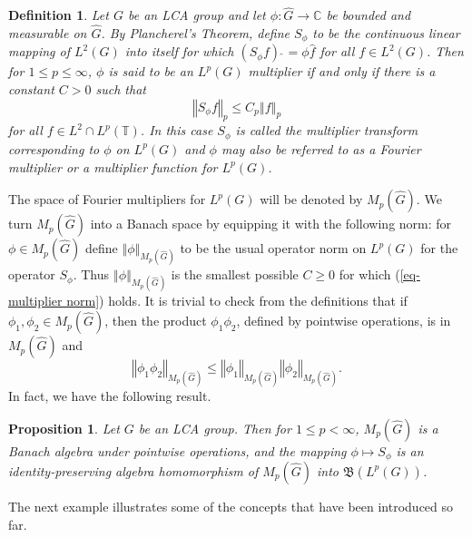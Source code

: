 \documentclass[mstat,12pt]{unswthesis}  %
\newcommand{\C}{\mathbb{C}}
\newcommand{\T}{\mathbb{T}}
\newcommand{\B}{\mathfrak{B}}
\newcommand{\hatt}[1]{\widehat #1}
\def\norm#1{\left \Vert #1 \right \Vert}
\newtheorem{proposition}[theorem]{Proposition}
\newtheorem{definition}[theorem]{Definition}
\numberwithin{equation}{section}
\begin{document}
\begin{definition}\label{multipliers}
Let $G$ be an LCA group and let
$\phi:\hatt{G}\rightarrow\C$ be bounded and measurable on $\hatt{G}$. By
Plancherel's Theorem, define $S_{\phi}$ to be the continuous linear mapping of
$L^2(G)$ into itself for which
$({S_{\phi}f})\,\hatt{\,} = \phi \hatt{f}$ for all $f\in L^2(G)$.
Then for $1\leq p\leq\infty$, $\phi$ is said to be an 
{\em $L^p(G)$ multiplier} if
and only if there is a constant $C>0$ such that
\begin{equation}\label{eq-multiplier norm}
\norm{S_{\phi}f}_p\leq C_p\norm{f}_p
\end{equation}
for all $f\in L^2\cap L^p(\T)$.
In this case $S_{\phi}$ is called the {\em multiplier transform corresponding
to $\phi$ on $L^p(G)$} and $\phi$ may also be referred to as a
{\em Fourier multiplier} or a {\em multiplier function} for $L^p(G)$.
\end{definition}


The space of Fourier multipliers for $L^p(G)$ will be denoted by
$M_p(\hatt{G})$. We turn $M_p(\hatt{G})$ into a Banach space by equipping it 
with
the following norm: for $\phi\in M_p(\hatt{G})$ define
$\norm{\phi}_{M_p(\hatt{G})}$ to be the usual operator norm on $L^p(G)$ for the
operator $S_{\phi}$. Thus $\norm{\phi}_{M_p(\hatt{G})}$ is the smallest
possible $C\geq 0$ for which (\ref{eq-multiplier norm}) holds. It is
trivial to check from the definitions that if $\phi_1,\phi_2\in M_p(\hatt{G})$,
then the product $\phi_1\phi_2$, defined by pointwise operations, is in
$M_p(\hatt{G})$ and
\[\norm{\phi_1\phi_2}_{M_p(\hatt{G})}\leq\norm{\phi_1}_{M_p(\hatt{G})}
\norm{\phi_2}_{M_p(\hatt{G})}.\]
In fact, we have the following result.

\begin{proposition}\label{multiplier algebra}\cite[\S3]{BG Spectral}
Let $G$ be an LCA group. Then for $1\leq p<\infty$,
$M_p(\hatt{G})$ is a Banach algebra under pointwise operations, and the mapping
$\phi\mapsto S_{\phi}$ is an identity-preserving algebra homomorphism of
$M_p(\hatt{G})$ into $\B(L^p(G))$.
\end{proposition}

The next example illustrates some of the concepts that
have been introduced so far.
\end{document}
